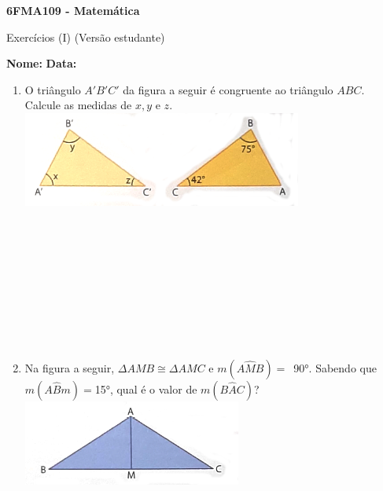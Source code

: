\documentclass[a4paper,14pt]{article}
\begin{document}
	
	\noindent\textbf{6FMA109 - Matemática} 
	
	\begin{center}Exercícios (I) (Versão estudante)
	\end{center}
	
	\noindent\textbf{Nome:} \underline{\hspace{10cm}}
	\noindent\textbf{Data:} \underline{\hspace{4cm}}
	
	
	\begin{multicols}{2}
		\begin{enumerate} 
			\item O triângulo $A'B'C'$ da figura a seguir é congruente ao triângulo $ABC$. Calcule as medidas de $x, y$ e $z$. \\
			\includegraphics[width=1.1\linewidth]{6FMA109_imagens/imagem1}
			\\\\\\\\\\\\\\\\\\\\
			\item  Na figura a seguir, $\Delta$$AMB \cong \Delta$$AMC$ e $m(A\hat{M}B) = $~90°. Sabendo que $m(A\hat{B}m) = $15°, qual é o valor de $m(B\hat{A}C)$? \\
				\includegraphics[width=1.1\linewidth]{6FMA109_imagens/imagem2}

\end{enumerate}
\end{multicols}
\end{document}
